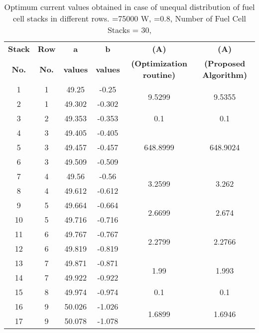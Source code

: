 \documentclass[twocolumn]{autart}
\begin{document}
\begin{table*}[t]
  \centering
   \caption{Optimum current values obtained in case of unequal distribution of fuel cell stacks in different rows. =75000 W,   	=0.8, Number of Fuel Cell Stacks = 30, }
      \begin{tabular}{cccccc}
      \toprule
      \textbf{Stack} & \textbf{Row}   &  \textbf{a }   & \textbf{ b}   & \textbf{ (A)} & \textbf{ (A)} \\
\textbf{No.} &   \textbf{No.}    & \textbf{values} & \textbf{values} & \textbf{{\scriptsize (Optimization routine)}}      &\textbf{{\scriptsize (Proposed Algorithm)}}  \\
     \midrule
    1     & 1     & 49.25 & -0.25 & \multirow{2}[4]{*}{9.5299} & \multirow{2}[4]{*}{9.5355} \\ 
    2     & 1     & 49.302 & -0.302 &       &  \\\midrule
    3     & 2     & 49.353 & -0.353 & 0.1   & 0.1 \\ \midrule
    4     & 3     & 49.405 & -0.405 & \multirow{3}[6]{*}{648.8999} & \multirow{3}[6]{*}{648.9024} \\
    5     & 3     & 49.457 & -0.457 &       &  \\
    6     & 3     & 49.509 & -0.509 &       &  \\ \midrule
    7     & 4     & 49.56 & -0.56 & \multirow{2}[4]{*}{3.2599} & \multirow{2}[4]{*}{3.262} \\
    8     & 4     & 49.612 & -0.612 &       &  \\ \midrule
    9     & 5     & 49.664 & -0.664 & \multirow{2}[4]{*}{2.6699} & \multirow{2}[4]{*}{2.674} \\
    10    & 5     & 49.716 & -0.716 &       &  \\ \midrule
    11    & 6     & 49.767 & -0.767 & \multirow{2}[4]{*}{2.2799} & \multirow{2}[4]{*}{2.2766} \\
    12    & 6     & 49.819 & -0.819 &       &  \\ \midrule
    13    & 7     & 49.871 & -0.871 & \multirow{2}[4]{*}{1.99} & \multirow{2}[4]{*}{1.993} \\
    14    & 7     & 49.922 & -0.922 &       &  \\ \midrule
    15    & 8     & 49.974 & -0.974 & 0.1   & 0.1 \\ \midrule
    16    & 9     & 50.026 & -1.026 & \multirow{2}[4]{*}{1.6899} & \multirow{2}[4]{*}{1.6946} \\
    17    & 9     & 50.078 & -1.078 &       &  \\ \midrule

\end{tabular}
\end{table*}
\end{document}

